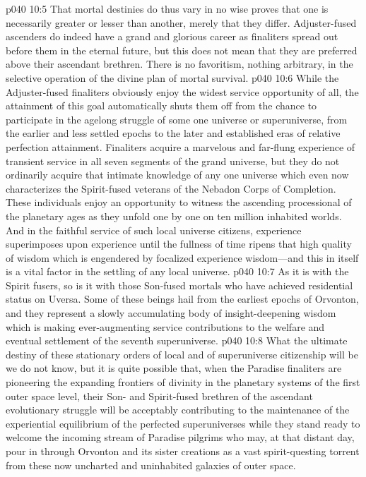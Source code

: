 \pc \vs p040 10:5 That mortal destinies do thus vary in no wise proves that one is necessarily greater or lesser than another, merely that they differ. Adjuster\hyp{}fused ascenders do indeed have a grand and glorious career as finaliters spread out before them in the eternal future, but this does not mean that they are preferred above their ascendant brethren. There is no favoritism, nothing arbitrary, in the selective operation of the divine plan of mortal survival.
\pc \vs p040 10:6 While the Adjuster\hyp{}fused finaliters obviously enjoy the widest service opportunity of all, the attainment of this goal automatically shuts them off from the chance to participate in the agelong struggle of some one universe or superuniverse, from the earlier and less settled epochs to the later and established eras of relative perfection attainment. Finaliters acquire a marvelous and far\hyp{}flung experience of transient service in all seven segments of the grand universe, but they do not ordinarily acquire that intimate knowledge of any one universe which even now characterizes the Spirit\hyp{}fused veterans of the Nebadon Corps of Completion. These individuals enjoy an opportunity to witness the ascending processional of the planetary ages as they unfold one by one on ten million inhabited worlds. And in the faithful service of such local universe citizens, experience superimposes upon experience until the fullness of time ripens that high quality of wisdom which is engendered by focalized experience wisdom---and this in itself is a vital factor in the settling of any local universe.
\vs p040 10:7 As it is with the Spirit fusers, so is it with those Son\hyp{}fused mortals who have achieved residential status on Uversa. Some of these beings hail from the earliest epochs of Orvonton, and they represent a slowly accumulating body of insight\hyp{}deepening wisdom which is making ever\hyp{}augmenting service contributions to the welfare and eventual settlement of the seventh superuniverse.
\pc \vs p040 10:8 What the ultimate destiny of these stationary orders of local and of superuniverse citizenship will be we do not know, but it is quite possible that, when the Paradise finaliters are pioneering the expanding frontiers of divinity in the planetary systems of the first outer space level, their Son\hyp{} and Spirit\hyp{}fused brethren of the ascendant evolutionary struggle will be acceptably contributing to the maintenance of the experiential equilibrium of the perfected superuniverses while they stand ready to welcome the incoming stream of Paradise pilgrims who may, at that distant day, pour in through Orvonton and its sister creations as a vast spirit\hyp{}questing torrent from these now uncharted and uninhabited galaxies of outer space.
